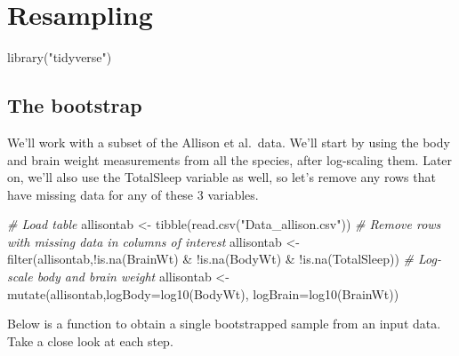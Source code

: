 \documentclass[
]{book}
\newenvironment{Shaded}{\begin{snugshade}}{\end{snugshade}}
\newcommand{\AttributeTok}[1]{\textcolor[rgb]{0.77,0.63,0.00}{#1}}
\newcommand{\CommentTok}[1]{\textcolor[rgb]{0.56,0.35,0.01}{\textit{#1}}}
\newcommand{\FunctionTok}[1]{\textcolor[rgb]{0.00,0.00,0.00}{#1}}
\newcommand{\NormalTok}[1]{#1}
\newcommand{\OtherTok}[1]{\textcolor[rgb]{0.56,0.35,0.01}{#1}}
\newcommand{\SpecialCharTok}[1]{\textcolor[rgb]{0.00,0.00,0.00}{#1}}
\newcommand{\StringTok}[1]{\textcolor[rgb]{0.31,0.60,0.02}{#1}}
\begin{document}
\hypertarget{resampling}{%
\chapter{Resampling}\label{resampling}}

\begin{Shaded}
\begin{Highlighting}[]
\FunctionTok{library}\NormalTok{(}\StringTok{"tidyverse"}\NormalTok{)}
\end{Highlighting}
\end{Shaded}

\hypertarget{the-bootstrap}{%
\section{The bootstrap}\label{the-bootstrap}}

We'll work with a subset of the Allison et al.~data. We'll start by using the body and brain weight measurements from all the species, after log-scaling them. Later on, we'll also use the TotalSleep variable as well, so let's remove any rows that have missing data for any of these 3 variables.

\begin{Shaded}
\begin{Highlighting}[]
\CommentTok{\# Load table}
\NormalTok{allisontab }\OtherTok{\textless{}{-}} \FunctionTok{tibble}\NormalTok{(}\FunctionTok{read.csv}\NormalTok{(}\StringTok{"Data\_allison.csv"}\NormalTok{))}
\CommentTok{\# Remove rows with missing data in columns of interest }
\NormalTok{allisontab }\OtherTok{\textless{}{-}} \FunctionTok{filter}\NormalTok{(allisontab,}\SpecialCharTok{!}\FunctionTok{is.na}\NormalTok{(BrainWt) }\SpecialCharTok{\&} \SpecialCharTok{!}\FunctionTok{is.na}\NormalTok{(BodyWt) }\SpecialCharTok{\&} \SpecialCharTok{!}\FunctionTok{is.na}\NormalTok{(TotalSleep))}
\CommentTok{\# Log{-}scale body and brain weight}
\NormalTok{allisontab }\OtherTok{\textless{}{-}} \FunctionTok{mutate}\NormalTok{(allisontab,}\AttributeTok{logBody=}\FunctionTok{log10}\NormalTok{(BodyWt), }\AttributeTok{logBrain=}\FunctionTok{log10}\NormalTok{(BrainWt))}
\end{Highlighting}
\end{Shaded}

Below is a function to obtain a single bootstrapped sample from an input data. Take a close look at each step.
\end{document}
